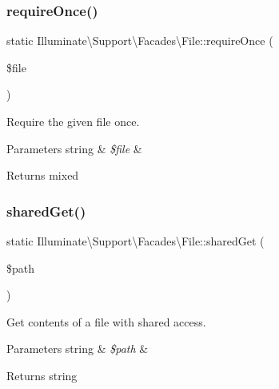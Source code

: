 \subsubsection{\texorpdfstring{require\+Once()}{requireOnce()}}
{\footnotesize\ttfamily static Illuminate\textbackslash{}\+Support\textbackslash{}\+Facades\textbackslash{}\+File\+::require\+Once (\begin{DoxyParamCaption}\item[{}]{\$file }\end{DoxyParamCaption})\hspace{0.3cm}{\ttfamily [static]}}

Require the given file once.


\begin{DoxyParams}[1]{Parameters}
string & {\em \$file} & \\
\hline
\end{DoxyParams}
\begin{DoxyReturn}{Returns}
mixed 
\end{DoxyReturn}
\mbox{\label{class_illuminate_1_1_support_1_1_facades_1_1_file_ae17d9ca36b3f2c31a3867bda05fd496d}} 
\subsubsection{\texorpdfstring{shared\+Get()}{sharedGet()}}
{\footnotesize\ttfamily static Illuminate\textbackslash{}\+Support\textbackslash{}\+Facades\textbackslash{}\+File\+::shared\+Get (\begin{DoxyParamCaption}\item[{}]{\$path }\end{DoxyParamCaption})\hspace{0.3cm}{\ttfamily [static]}}

Get contents of a file with shared access.


\begin{DoxyParams}[1]{Parameters}
string & {\em \$path} & \\
\hline
\end{DoxyParams}
\begin{DoxyReturn}{Returns}
string 
\end{DoxyReturn}
\mbox{\label{class_illuminate_1_1_support_1_1_facades_1_1_file_ae308662be3b972938b9060f5db95cee9}} 
